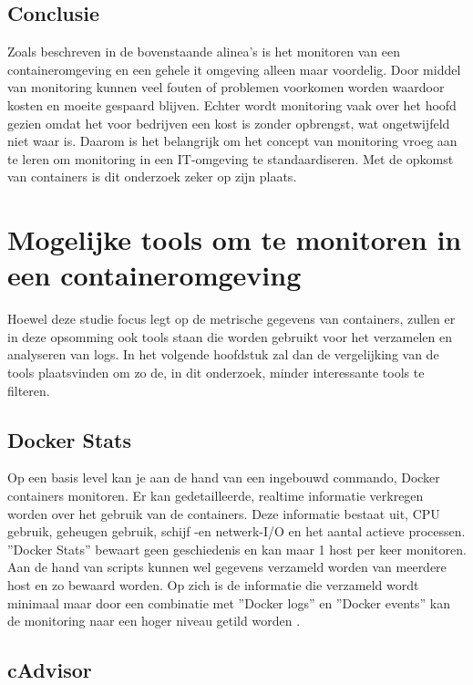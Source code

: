 \subsection{Conclusie}

Zoals beschreven in de bovenstaande alinea's is het monitoren van een containeromgeving en een gehele it omgeving alleen maar voordelig.  Door middel van monitoring kunnen veel fouten of problemen voorkomen worden waardoor kosten en moeite gespaard blijven. Echter wordt monitoring vaak over het hoofd gezien omdat het voor bedrijven een kost is zonder opbrengst, wat ongetwijfeld niet waar is. Daarom is het belangrijk om het concept van monitoring vroeg aan te leren om monitoring in een IT-omgeving te standaardiseren. Met de opkomst van containers is dit onderzoek zeker op zijn plaats.

\section{Mogelijke tools om te monitoren in een containeromgeving}\label{lab:tools}

Hoewel deze studie focus legt op de metrische gegevens van containers, zullen er in deze opsomming ook tools staan die worden gebruikt voor het verzamelen en analyseren van logs. In het volgende hoofdstuk zal dan de vergelijking van de tools plaatsvinden om zo de, in dit onderzoek, minder interessante tools te filteren.

\subsection{Docker Stats}

Op een basis level kan je aan de hand van een ingebouwd commando, Docker containers monitoren. Er kan gedetailleerde, realtime informatie verkregen worden over het gebruik van de containers. Deze informatie bestaat uit, CPU gebruik, geheugen gebruik, schijf -en netwerk-I/O en het aantal actieve processen. ''Docker Stats'' bewaart geen geschiedenis en kan maar 1 host per keer monitoren. Aan de hand van scripts kunnen wel gegevens verzameld worden van meerdere host en zo bewaard worden. Op zich is de informatie die verzameld wordt minimaal maar door een combinatie met ''Docker logs'' en ''Docker events''  kan de monitoring naar een hoger niveau getild worden \autocite{Sissons2021}.  

\subsection{cAdvisor}

